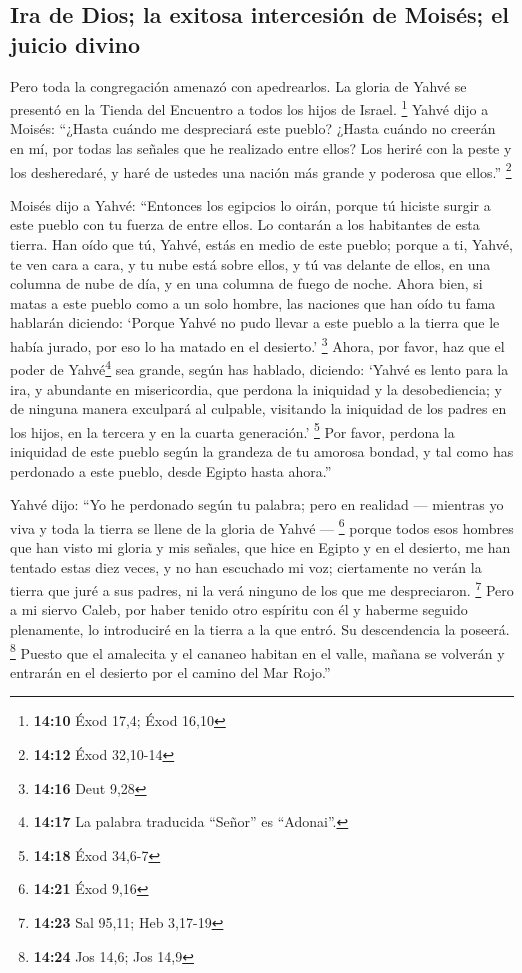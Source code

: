 \hypertarget{ira-de-dios-la-exitosa-intercesiuxf3n-de-moisuxe9s-el-juicio-divino}{%
\subsection{Ira de Dios; la exitosa intercesión de Moisés; el juicio
divino}\label{ira-de-dios-la-exitosa-intercesiuxf3n-de-moisuxe9s-el-juicio-divino}}

 Pero toda la congregación amenazó con apedrearlos. La
gloria de Yahvé se presentó en la Tienda del Encuentro a todos los hijos
de Israel. \footnote{\textbf{14:10} Éxod 17,4; Éxod 16,10}
 Yahvé dijo a Moisés: ``¿Hasta cuándo me despreciará este
pueblo? ¿Hasta cuándo no creerán en mí, por todas las señales que he
realizado entre ellos?  Los heriré con la peste y los
desheredaré, y haré de ustedes una nación más grande y poderosa que
ellos.'' \footnote{\textbf{14:12} Éxod 32,10-14}

 Moisés dijo a Yahvé: ``Entonces los egipcios lo oirán,
porque tú hiciste surgir a este pueblo con tu fuerza de entre ellos.
 Lo contarán a los habitantes de esta tierra. Han oído
que tú, Yahvé, estás en medio de este pueblo; porque a ti, Yahvé, te ven
cara a cara, y tu nube está sobre ellos, y tú vas delante de ellos, en
una columna de nube de día, y en una columna de fuego de noche.
 Ahora bien, si matas a este pueblo como a un solo
hombre, las naciones que han oído tu fama hablarán diciendo:
 `Porque Yahvé no pudo llevar a este pueblo a la tierra
que le había jurado, por eso lo ha matado en el desierto.' \footnote{\textbf{14:16}
  Deut 9,28}  Ahora, por favor, haz que el poder de
Yahvé\footnote{\textbf{14:17} La palabra traducida ``Señor'' es
  ``Adonai''.} sea grande, según has hablado, diciendo: 
`Yahvé es lento para la ira, y abundante en misericordia, que perdona la
iniquidad y la desobediencia; y de ninguna manera exculpará al culpable,
visitando la iniquidad de los padres en los hijos, en la tercera y en la
cuarta generación.' \footnote{\textbf{14:18} Éxod 34,6-7}
 Por favor, perdona la iniquidad de este pueblo según la
grandeza de tu amorosa bondad, y tal como has perdonado a este pueblo,
desde Egipto hasta ahora.''

 Yahvé dijo: ``Yo he perdonado según tu palabra;
 pero en realidad --- mientras yo viva y toda la tierra
se llene de la gloria de Yahvé --- \footnote{\textbf{14:21} Éxod 9,16}
 porque todos esos hombres que han visto mi gloria y mis
señales, que hice en Egipto y en el desierto, me han tentado estas diez
veces, y no han escuchado mi voz;  ciertamente no verán
la tierra que juré a sus padres, ni la verá ninguno de los que me
despreciaron. \footnote{\textbf{14:23} Sal 95,11; Heb 3,17-19}
 Pero a mi siervo Caleb, por haber tenido otro espíritu
con él y haberme seguido plenamente, lo introduciré en la tierra a la
que entró. Su descendencia la poseerá. \footnote{\textbf{14:24} Jos
  14,6; Jos 14,9}  Puesto que el amalecita y el cananeo
habitan en el valle, mañana se volverán y entrarán en el desierto por el
camino del Mar Rojo.''

